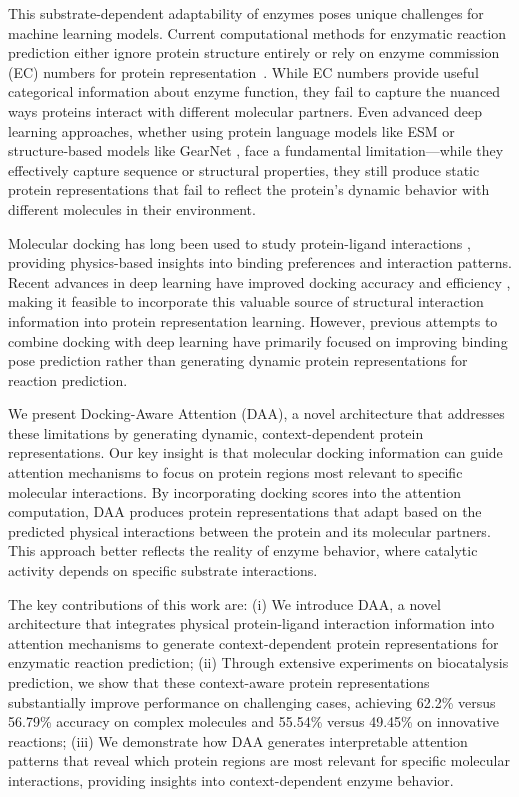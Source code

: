 \documentclass[sigconf]{acmart}
\begin{document}
This substrate-dependent adaptability of enzymes poses unique challenges for machine learning models. Current computational methods for enzymatic reaction prediction either ignore protein structure entirely or rely on enzyme commission (EC) numbers for protein representation~\cite{Probst2022,Chen2023}. While EC numbers provide useful categorical information about enzyme function, they fail to capture the nuanced ways proteins interact with different molecular partners. Even advanced deep learning approaches, whether using protein language models like ESM \cite{hayes2024simulating} or structure-based models like GearNet \cite{zhang2023protein}, face a fundamental limitation—while they effectively capture sequence or structural properties, they still produce static protein representations that fail to reflect the protein's dynamic behavior with different molecules in their environment.


Molecular docking has long been used to study protein-ligand interactions \cite{muhammed2024molecular}, providing physics-based insights into binding preferences and interaction patterns. Recent advances in deep learning have improved docking accuracy and efficiency \cite{DiffDock2023}, making it feasible to incorporate this valuable source of structural interaction information into protein representation learning. However, previous attempts to combine docking with deep learning have primarily focused on improving binding pose prediction rather than generating dynamic protein representations for reaction prediction.


We present Docking-Aware Attention (DAA), a novel architecture that addresses these limitations by generating dynamic, context-dependent protein representations. Our key insight is that molecular docking information can guide attention mechanisms to focus on protein regions most relevant to specific molecular interactions. By incorporating docking scores into the attention computation, DAA produces protein representations that adapt based on the predicted physical interactions between the protein and its molecular partners. This approach better reflects the reality of enzyme behavior, where catalytic activity depends on specific substrate interactions.

The key contributions of this work are: (i) We introduce DAA, a novel architecture that integrates physical protein-ligand interaction information into attention mechanisms to generate context-dependent protein representations for enzymatic reaction prediction; (ii) Through extensive experiments on biocatalysis prediction, we show that these context-aware protein representations substantially improve performance on challenging cases, achieving 62.2\% versus 56.79\% accuracy on complex molecules and 55.54\% versus 49.45\% on innovative reactions; (iii) We demonstrate how DAA generates interpretable attention patterns that reveal which protein regions are most relevant for specific molecular interactions, providing insights into context-dependent enzyme behavior.
\end{document}
